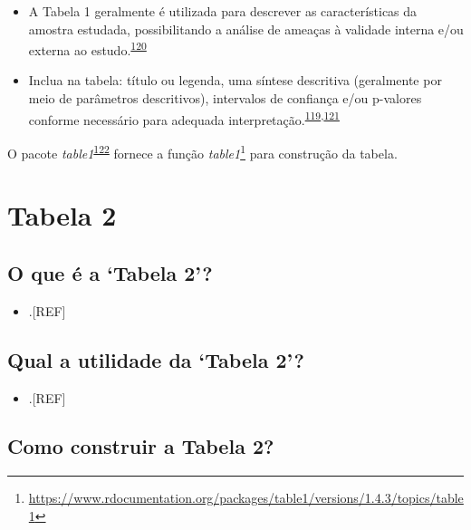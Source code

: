 \documentclass[
]{book}
\providecommand{\tightlist}{%
  \setlength{\itemsep}{0pt}\setlength{\parskip}{0pt}}
\renewcommand{\href}[2]{#2\footnote{\url{#1}}}
\newenvironment{infobox}[1]
  {
  \begin{itemize}
  \renewcommand{\labelitemi}{
    \raisebox{-.7\height}[0pt][0pt]{
      {\setkeys{Gin}{width=3em,keepaspectratio}
        \texttt{[image: \#1]}}
    }
  }
  \setlength{\fboxsep}{1em}
  \begin{blackbox}
  \item
  }
  {
  \end{blackbox}
  \end{itemize}
  }
\begin{document}
\begin{itemize}
\item
  A Tabela 1 geralmente é utilizada para descrever as características da amostra estudada, possibilitando a análise de ameaças à validade interna e/ou externa ao estudo.\textsuperscript{\protect\hyperlink{ref-Hayes-Larson2019}{120}}
\item
  Inclua na tabela: título ou legenda, uma síntese descritiva (geralmente por meio de parâmetros descritivos), intervalos de confiança e/ou p-valores conforme necessário para adequada interpretação.\textsuperscript{\protect\hyperlink{ref-Inskip2017}{119},\protect\hyperlink{ref-Kwak2021}{121}}
\end{itemize}

\begin{infobox}{images/Rlogo}
O pacote \emph{table1}\textsuperscript{\protect\hyperlink{ref-table1}{122}} fornece a função \href{https://www.rdocumentation.org/packages/table1/versions/1.4.3/topics/table1}{\emph{table1}} para construção da tabela.

\end{infobox}

\hypertarget{tabela-2}{%
\section{Tabela 2}\label{tabela-2}}

\hypertarget{o-que-uxe9-a-tabela-2}{%
\subsection{O que é a `Tabela 2'?}\label{o-que-uxe9-a-tabela-2}}

\begin{itemize}
\tightlist
\item
  .{[}REF{]}
\end{itemize}

\hypertarget{qual-a-utilidade-da-tabela-2}{%
\subsection{Qual a utilidade da `Tabela 2'?}\label{qual-a-utilidade-da-tabela-2}}

\begin{itemize}
\tightlist
\item
  .{[}REF{]}
\end{itemize}

\hypertarget{como-construir-a-tabela-2}{%
\subsection{Como construir a Tabela 2?}\label{como-construir-a-tabela-2}}
\end{document}
